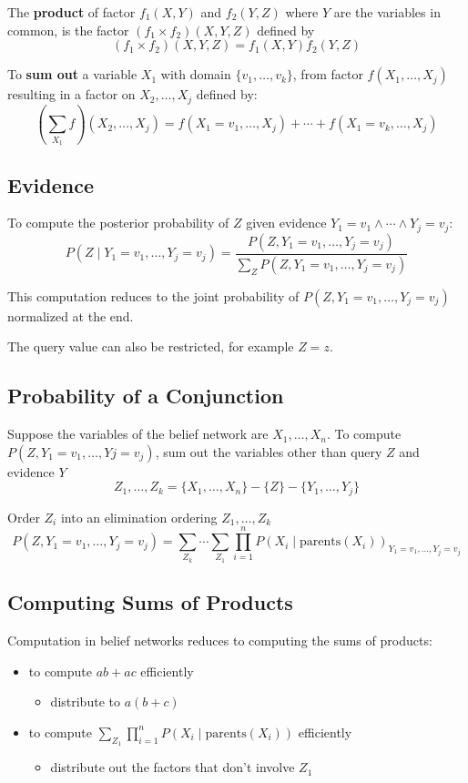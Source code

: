 \documentclass[11pt]{article}
\begin{document}
The \textbf{product} of factor \(f_{1} (X,Y)\) and \(f_{2} (Y,Z)\) where \(Y\) are the variables in common,
is the factor \((f_{1} \times f_{2}) (X,Y,Z)\) defined by
$$ (f_{1} \times f_{2}) (X,Y,Z) = f_{1} (X,Y) f_{2} (Y,Z) $$

To \textbf{sum out} a variable \(X_{1}\) with domain \(\{ v_{1}, \dots, v_{k} \}\), from factor
\(f(X_{1}, \dots, X_{j})\) resulting in a factor on \(X_{2}, \dots, X_{j}\) defined by:
$$ \left( \sum_{X_{1}} f \right) (X_{2}, \dots, X_{j}) = f(X_{1} = v_{1}, \dots, X_{j}) + \cdots + f(X_{1} = v_{k}, \dots, X_{j}) $$
\subsection{Evidence}
\label{sec:org6891b59}
To compute the posterior probability of \(Z\) given evidence
\(Y_{1} = v_{1} \wedge \cdots \wedge Y_{j} = v_{j}\):
$$ P(Z \mid Y_{1} = v_{1}, \dots, Y_{j} = v_{j}) = \frac{P(Z, Y_{1} = v_{1}, \dots, Y_{j} = v_{j})}{\sum_{Z} P(Z, Y_{1} = v_{1}, \dots, Y_{j} = v_{j})} $$

This computation reduces to the joint probability of \(P(Z, Y_{1} = v_{1}, \dots, Y_{j} = v_{j})\)
normalized at the end.

The query value can also be restricted, for example \(Z = z\).
\subsection{Probability of a Conjunction}
\label{sec:orge50ffb0}
Suppose the variables of the belief network are \(X_{1}, \dots, X_{n}\).
To compute \(P(Z, Y_{1} = v_{1}, \dots, Y{j} = v_{j})\), sum out the variables other than query \(Z\)
and evidence \(Y\)
$$ Z_{1}, \dots, Z_{k} = \{ X_{1}, \dots, X_{n} \} - \{ Z \} - \{ Y_{1}, \dots, Y_{j} \} $$

Order \(Z_{i}\) into an elimination ordering \(Z_{1}, \dots, Z_{k}\)
$$ P(Z, Y_{1} = v_{1}, \dots, Y_{j} = v_{j}) = \sum_{Z_{k}} \cdots \sum_{Z_{1}} \prod_{i=1}^{n} P(X_{i} \mid \text{parents}(X_{i}))_{Y_{1} = v_{1}, \dots, Y_{j} = v_{j}} $$
\subsection{Computing Sums of Products}
\label{sec:org9304f00}
Computation in belief networks reduces to computing the sums of products:
\begin{itemize}
\item to compute \(ab + ac\) efficiently
\begin{itemize}
\item distribute to \(a(b + c)\)
\end{itemize}
\item to compute \(\sum_{Z_{1}} \prod_{i=1}^{n} P(X_{i} \mid \text{parents}(X_{i}))\) efficiently
\begin{itemize}
\item distribute out the factors that don't involve \(Z_{1}\)
\end{itemize}
\end{itemize}
\end{document}
